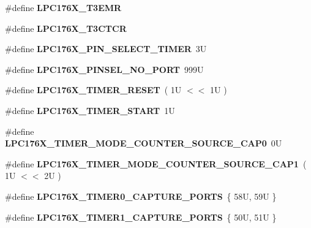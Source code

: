 \begin{DoxyCompactItemize}
\#define {\bfseries L\+P\+C176\+X\+\_\+\+T3\+E\+MR}
\item 
\#define {\bfseries L\+P\+C176\+X\+\_\+\+T3\+C\+T\+CR}
\item 
\mbox{\label{timer-defs_8h_a5a8de6ca61eaed2cba879e521b706eae}} 
\#define {\bfseries L\+P\+C176\+X\+\_\+\+P\+I\+N\+\_\+\+S\+E\+L\+E\+C\+T\+\_\+\+T\+I\+M\+ER}~3U
\item 
\mbox{\label{timer-defs_8h_aefb464537ebda87efb128fb8bb908c24}} 
\#define {\bfseries L\+P\+C176\+X\+\_\+\+P\+I\+N\+S\+E\+L\+\_\+\+N\+O\+\_\+\+P\+O\+RT}~999U
\item 
\mbox{\label{timer-defs_8h_a01d9cebb3ee58b67d579d33981a042c2}} 
\#define {\bfseries L\+P\+C176\+X\+\_\+\+T\+I\+M\+E\+R\+\_\+\+R\+E\+S\+ET}~( 1\+U $<$$<$ 1\+U )
\item 
\mbox{\label{timer-defs_8h_af8e1df778fc6e642812c91d63af16543}} 
\#define {\bfseries L\+P\+C176\+X\+\_\+\+T\+I\+M\+E\+R\+\_\+\+S\+T\+A\+RT}~1U
\item 
\mbox{\label{timer-defs_8h_af6cf91a4949a7b5afea404e50ddd6081}} 
\#define {\bfseries L\+P\+C176\+X\+\_\+\+T\+I\+M\+E\+R\+\_\+\+M\+O\+D\+E\+\_\+\+C\+O\+U\+N\+T\+E\+R\+\_\+\+S\+O\+U\+R\+C\+E\+\_\+\+C\+A\+P0}~0U
\item 
\mbox{\label{timer-defs_8h_a7c7c6b3b7cde540b6197db44e5d6cc6e}} 
\#define {\bfseries L\+P\+C176\+X\+\_\+\+T\+I\+M\+E\+R\+\_\+\+M\+O\+D\+E\+\_\+\+C\+O\+U\+N\+T\+E\+R\+\_\+\+S\+O\+U\+R\+C\+E\+\_\+\+C\+A\+P1}~( 1\+U $<$$<$ 2\+U )
\item 
\mbox{\label{timer-defs_8h_a8e2113fef59ebd8a5f3cf64c7ba0a005}} 
\#define {\bfseries L\+P\+C176\+X\+\_\+\+T\+I\+M\+E\+R0\+\_\+\+C\+A\+P\+T\+U\+R\+E\+\_\+\+P\+O\+R\+TS}~\{ 58\+U, 59\+U \}
\item 
\mbox{\label{timer-defs_8h_a8781d990a16c237ea789a51470725a7d}} 
\#define {\bfseries L\+P\+C176\+X\+\_\+\+T\+I\+M\+E\+R1\+\_\+\+C\+A\+P\+T\+U\+R\+E\+\_\+\+P\+O\+R\+TS}~\{ 50\+U, 51\+U \}
\item 
\mbox{\label{timer-defs_8h_abcabd57f103b37179d9d010fb614f31f}} 

\end{DoxyCompactItemize}
